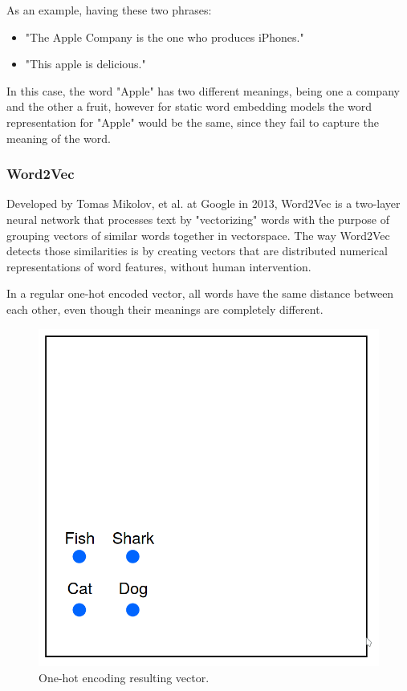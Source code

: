     \par As an example, having these two phrases:

    \begin{itemize}
        \item "The Apple Company is the one who produces iPhones."
        \item "This apple is delicious."
    \end{itemize}

    \par In this case, the word "Apple" has two different meanings, being one a company and the other a fruit, however for static word embedding models the word representation for "Apple" would be the same, since they fail to capture the meaning of the word. \cite{Batista2018}

   
        \subsubsection{Word2Vec}

        \par Developed by Tomas Mikolov, et al. \cite{Mikolov2013}  at Google in 2013, Word2Vec is a two-layer neural network that processes text by "vectorizing" words with the purpose of grouping vectors of similar words together in vectorspace. The way Word2Vec detects those similarities is by creating vectors that are distributed numerical representations of word features, without human intervention.


        \par In a regular one-hot encoded vector, all words have the same distance between each other, even though their meanings are completely different.

        \begin{figure}[htb]
            \centering
            \includegraphics[scale = 0.1]{Sections/3StateOfTheArt/3_images/one_hot_ex.png}
            \caption{One-hot encoding resulting vector. \cite{word2vec_explained}} 
        \end{figure}


